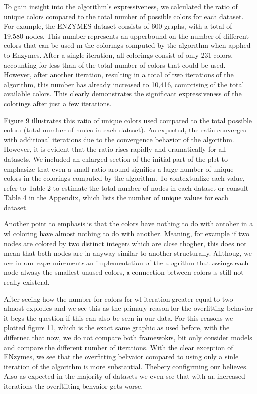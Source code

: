 To gain insight into the algorithm's expressiveness, we calculated the ratio of unique colors compared to the total number of possible colors for each dataset. For example, the ENZYMES dataset consists of 600 graphs, with a total of 19,580 nodes. This number represents an upperbound on the number of different colors that can be used in the colorings computed by the \wl algorithm when applied to Enzymes. After a single iteration, all colorings consist of only 231 colors, accounting for less than  of the total number of colors that could be used. However, after another iteration, resulting in a total of two iterations of the \wl algorithm, this number has already increased to 10,416, comprising  of the total available colors. This clearly demonstrates the significant expressiveness of the colorings after just a few iterations.

Figure 9 illustrates this ratio of unique colors used compared to the total possible colors (total number of nodes in each dataset). As expected, the ratio converges with additional \wl iterations due to the convergence behavior of the algorithm. However, it is evident that the ratio rises rapidly and dramatically for all datasets. We included an enlarged section of the initial part of the plot to emphasize that even a small ratio around  signifies a large number of unique colors in the colorings computed by the \wl algorithm. To contextualize each value, refer to Table 2 to estimate the total number of nodes in each dataset or consult Table 4 in the Appendix, which lists the number of unique values for each dataset.

Another point to emphasis is that the colors have nothing to do with antoher in a wl coloring have almost nothing to do with another. Meaning, for example if two nodes are colored by two distinct integers which are close thogher, this does not mean that both nodes are in anyway similar to another structurally. Allthoug, we use in our expermirements an implementation of the \wl alogrithm that assings each node alwasy the smallest unused colors, a connection between colors is still not really existend.

After seeing how the number for colors for wl iteration greater equal to two almost explodes and we see this as the primary reason for the overfitting behavior it begs the question if this can also be seen in our data. For this reasons we plotted figure 11, which is the exact same graphic as used before, with the differnec that now, we do not compare both framewokrs, bit only consider \wlnn models and compare the different number of \wl iterations. With the clear exception of ENzymes, we see that the overfitting behvaior compared to using only a sinle iteration of the \wl algorithm is more substantial. Thebery configrming our believes. Also as expected in the majority of datasets we even see that with an increased \wl iterations the overftiiting behvaior gets worse.


